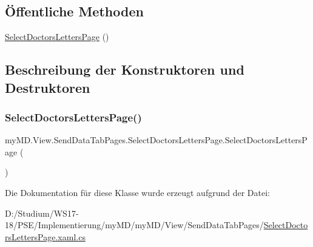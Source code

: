 \subsection*{Öffentliche Methoden}
\begin{DoxyCompactItemize}
\item 
\mbox{\hyperlink{classmy_m_d_1_1_view_1_1_send_data_tab_pages_1_1_select_doctors_letters_page_a8ae482a882150437ce322f4796d6c98e}{Select\+Doctors\+Letters\+Page}} ()
\end{DoxyCompactItemize}


\subsection{Beschreibung der Konstruktoren und Destruktoren}
\mbox{\label{classmy_m_d_1_1_view_1_1_send_data_tab_pages_1_1_select_doctors_letters_page_a8ae482a882150437ce322f4796d6c98e}} 
\subsubsection{\texorpdfstring{Select\+Doctors\+Letters\+Page()}{SelectDoctorsLettersPage()}}
{\footnotesize\ttfamily my\+M\+D.\+View.\+Send\+Data\+Tab\+Pages.\+Select\+Doctors\+Letters\+Page.\+Select\+Doctors\+Letters\+Page (\begin{DoxyParamCaption}{ }\end{DoxyParamCaption})}



Die Dokumentation für diese Klasse wurde erzeugt aufgrund der Datei\+:\begin{DoxyCompactItemize}
\item 
D\+:/\+Studium/\+W\+S17-\/18/\+P\+S\+E/\+Implementierung/my\+M\+D/my\+M\+D/\+View/\+Send\+Data\+Tab\+Pages/\mbox{\hyperlink{_select_doctors_letters_page_8xaml_8cs}{Select\+Doctors\+Letters\+Page.\+xaml.\+cs}}\end{DoxyCompactItemize}
